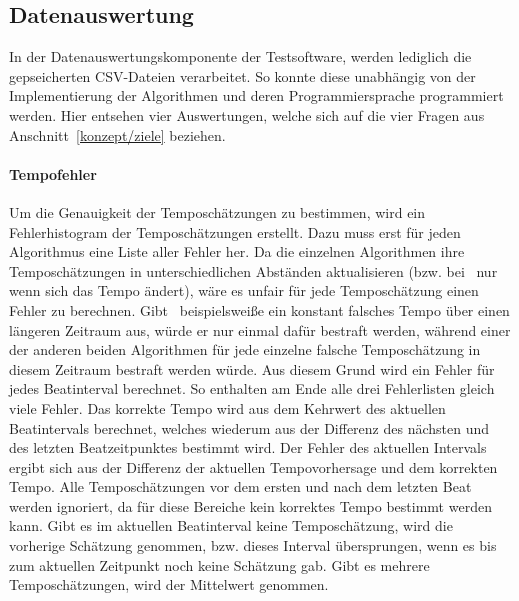{	\subsection{Datenauswertung}
	{
		In der Datenauswertungskomponente der Testsoftware,
			werden lediglich die gepseicherten CSV-Dateien verarbeitet.
		So konnte diese unabhängig von der Implementierung der Algorithmen und deren Programmiersprache programmiert werden.
		Hier entsehen vier Auswertungen,
			welche sich auf die vier Fragen aus Anschnitt~\ref{konzept/ziele} beziehen.

		\paragraph{Tempofehler}
		{
			Um die Genauigkeit der Temposchätzungen zu bestimmen,
				wird ein Fehlerhistogram der Temposchätzungen erstellt.
			Dazu muss erst für jeden Algorithmus eine Liste aller Fehler her.
			Da die einzelnen Algorithmen ihre Temposchätzungen in unterschiedlichen Abständen aktualisieren
				(bzw. bei~\cite{2011_PlRoSt} nur wenn sich das Tempo ändert),
				wäre es unfair für jede Temposchätzung einen Fehler zu berechnen.
			Gibt~\cite{2011_PlRoSt} beispielsweiße ein konstant falsches Tempo über einen längeren Zeitraum aus,
				würde er nur einmal dafür bestraft werden,
				während einer der anderen beiden Algorithmen für jede einzelne falsche Temposchätzung in diesem Zeitraum bestraft werden würde.
			Aus diesem Grund wird ein Fehler für jedes Beatinterval berechnet.
			So enthalten am Ende alle drei Fehlerlisten gleich viele Fehler.
			Das korrekte Tempo wird aus dem Kehrwert des aktuellen Beatintervals berechnet,
				welches wiederum aus der Differenz des nächsten und des letzten Beatzeitpunktes bestimmt wird.
			Der Fehler des aktuellen Intervals ergibt sich aus der Differenz der aktuellen Tempovorhersage und dem korrekten Tempo.
			Alle Temposchätzungen vor dem ersten und nach dem letzten Beat werden ignoriert,
				da für diese Bereiche kein korrektes Tempo bestimmt werden kann.
			Gibt es im aktuellen Beatinterval keine Temposchätzung,
				wird die vorherige Schätzung genommen,
				bzw. dieses Interval übersprungen,
				wenn es bis zum aktuellen Zeitpunkt noch keine Schätzung gab.
			Gibt es mehrere Temposchätzungen,
				wird der Mittelwert genommen.

}}}
